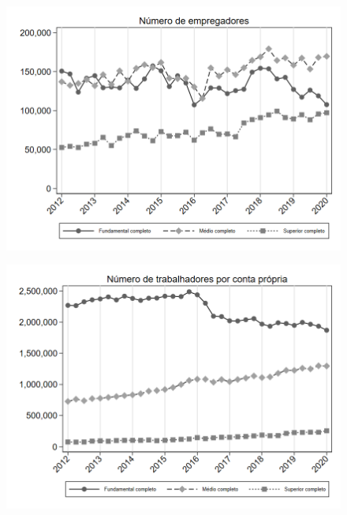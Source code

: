 \begin{frame}[label=_composicao_demografica_educacao_n_empregador]{}
\textit{\hyperlink{_composicao_demografica_educacao}{}}
\begin{figure}
  \centering
  \includegraphics[width=1.0\linewidth]{../../analysis/output/composicao_demografica/educacao/_composicao_demografica_educacao_n_empregador.png}
  \caption{}
  \label{fig:_composicao_demografica_educacao_n_empregador}
\end{figure}
\end{frame}



\begin{frame}[label=_composicao_demografica_educacao_n_cpropria]{}
\textit{\hyperlink{_composicao_demografica_educacao}{}}
\begin{figure}
  \centering
  \includegraphics[width=1.0\linewidth]{../../analysis/output/composicao_demografica/educacao/_composicao_demografica_educacao_n_cpropria.png}
  \caption{}
  \label{fig:_composicao_demografica_educacao_n_cpropria}
\end{figure}
\end{frame}

